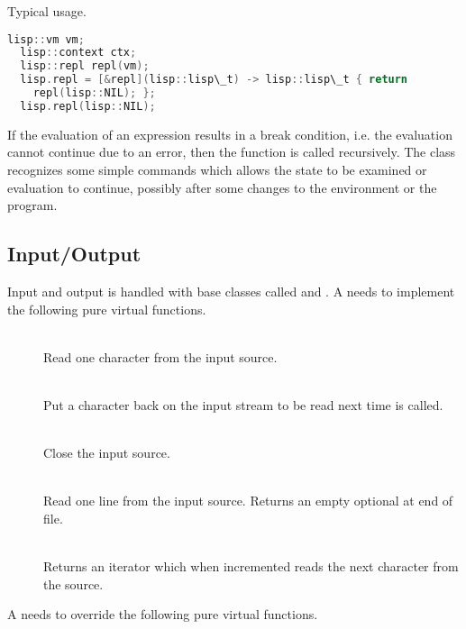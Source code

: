 Typical usage.

\begin{lstlisting}[language=c++]
  lisp::vm vm;
  lisp::context ctx;
  lisp::repl repl(vm);
  lisp.repl = [&repl](lisp::lisp\_t) -> lisp::lisp\_t { return
    repl(lisp::NIL); };
  lisp.repl(lisp::NIL);
\end{lstlisting}

If the evaluation of an expression results in a break condition,
i.e. the evaluation cannot continue due to an error, then the
 function is called recursively. The
 class recognizes some simple commands which allows
the state to be examined or evaluation to continue, possibly after
some changes to the environment or the program.

\subsection{Input/Output}
Input and output is handled with base classes called  and
. A  needs to implement the following pure
virtual functions.

\begin{description}
  \item[]  \\ Read one character from the input source.
  \item[]  \\ Put a character back on the input
    stream to be read next time  is called.
  \item[]  \\ Close the input source.
  \item[]  \\ Read one line
    from the input source. Returns an empty optional at end of file.
  \item[]  \\ Returns an iterator which when
    incremented reads the next character from the source.
\end{description}

A  needs to override the following pure virtual functions.

